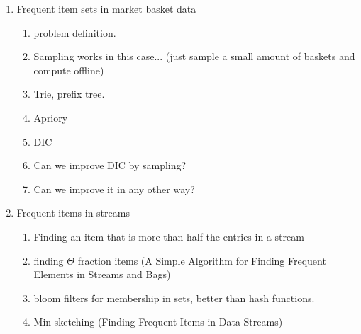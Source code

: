 \documentclass{article}
\begin{document}


\begin{enumerate}
\item Frequent item sets in market basket data
\begin{enumerate}
\item problem definition.
\item Sampling works in this case... (just sample a small amount of baskets and compute offline)
\item Trie, prefix tree.
\item Apriory 
\item DIC
\item Can we improve DIC by sampling?
\item Can we improve it in any other way?
\end{enumerate}
\item Frequent items in streams
\begin{enumerate}
\item Finding an item that is more than half the entries in a stream
\item finding $\Theta$ fraction items (A Simple Algorithm for Finding Frequent  Elements in Streams and Bags)
\item bloom filters for membership in sets, better than hash functions.
\item Min sketching (Finding Frequent Items in Data Streams)
\end{enumerate}

\end{enumerate}
\end{document}
